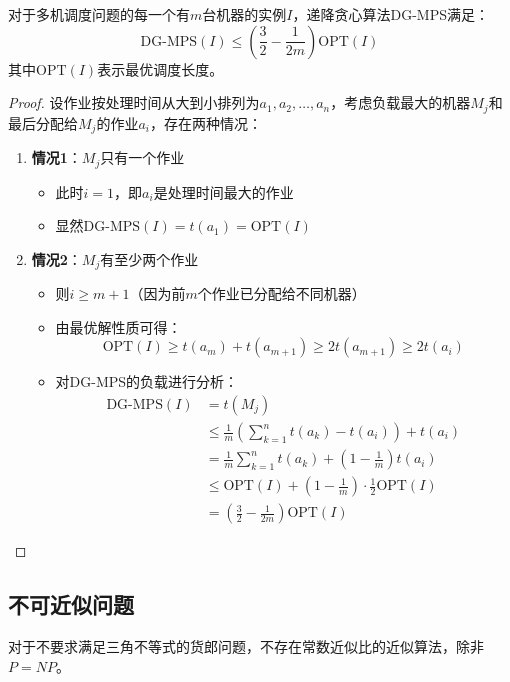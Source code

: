\documentclass[./../main.tex]{subfiles} %
\begin{document}
\begin{theorem}
对于多机调度问题的每一个有$m$台机器的实例$I$，递降贪心算法DG-MPS满足：
$$ \text{DG-MPS}(I) \leq \left(\frac{3}{2} - \frac{1}{2m}\right) \text{OPT}(I) $$
其中$\text{OPT}(I)$表示最优调度长度。
\end{theorem}

\begin{proof}
设作业按处理时间从大到小排列为$a_1,a_2,\ldots,a_n$，考虑负载最大的机器$M_j$和最后分配给$M_j$的作业$a_i$，存在两种情况：

\begin{enumerate}
    \item \textbf{情况1}：$M_j$只有一个作业
    \begin{itemize}
        \item 此时$i=1$，即$a_i$是处理时间最大的作业
        \item 显然$\text{DG-MPS}(I) = t(a_1) = \text{OPT}(I)$
    \end{itemize}

    \item \textbf{情况2}：$M_j$有至少两个作业
    \begin{itemize}
        \item 则$i \geq m+1$（因为前$m$个作业已分配给不同机器）
        \item 由最优解性质可得：
        $$ \text{OPT}(I) \geq t(a_m) + t(a_{m+1}) \geq 2t(a_{m+1}) \geq 2t(a_i) $$
        
        \item 对DG-MPS的负载进行分析：
        \begin{align*}
        \text{DG-MPS}(I) &= t(M_j) \\
        &\leq \frac{1}{m}\left(\sum_{k=1}^n t(a_k) - t(a_i)\right) + t(a_i) \\
        &= \frac{1}{m}\sum_{k=1}^n t(a_k) + \left(1-\frac{1}{m}\right)t(a_i) \\
        &\leq \text{OPT}(I) + \left(1-\frac{1}{m}\right)\cdot\frac{1}{2}\text{OPT}(I) \\
        &= \left(\frac{3}{2} - \frac{1}{2m}\right)\text{OPT}(I)
        \end{align*}
    \end{itemize}
\end{enumerate}
\end{proof}

\subsection{不可近似问题}
\begin{theorem}
对于不要求满足三角不等式的货郎问题，不存在常数近似比的近似算法，除非$P=NP$。
\end{theorem}
\end{document}
